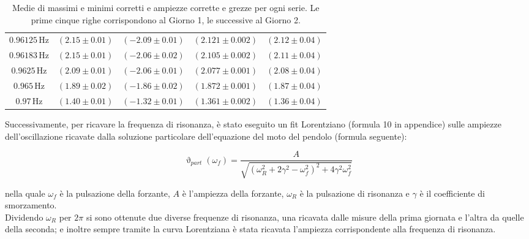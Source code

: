 \documentclass{article}
\begin{document}
\begin{table}[H]
\begin{tabular}{|c|c|c|c|c|}
$0.96125\,\text{Hz}$ & $(2.15 \pm 0.01)$ & $(-2.09 \pm 0.01)$ & $(2.121 \pm 0.002)$ & $(2.12 \pm 0.04)$ \\
$0.96183\,\text{Hz}$ & $(2.15 \pm 0.01)$ & $(-2.06 \pm 0.02)$ & $(2.105 \pm 0.002)$ & $(2.11 \pm 0.04)$ \\
$0.9625\,\text{Hz}$ & $(2.09 \pm 0.01)$ & $(-2.06 \pm 0.01)$ & $(2.077 \pm 0.001)$ & $(2.08 \pm 0.04)$ \\
$0.965\,\text{Hz}$ & $(1.89 \pm 0.02)$ & $(-1.86 \pm 0.02)$ & $(1.872 \pm 0.001)$ & $(1.87 \pm 0.04)$ \\
$0.97\,\text{Hz}$ & $(1.40 \pm 0.01)$ & $(-1.32 \pm 0.01)$ & $(1.361 \pm 0.002)$ & $(1.36 \pm 0.04)$ \\
\bottomrule
\end{tabular}
\caption{Medie di massimi e minimi corretti e ampiezze corrette e grezze per ogni serie. Le prime cinque righe corrispondono al Giorno 1, le successive al Giorno 2.}
\label{max_min_amp_scientifica}
\end{table}



Successivamente, per ricavare la frequenza di risonanza, è stato eseguito un fit Lorentziano (formula 10 in appendice) sulle ampiezze dell'oscillazione ricavate dalla soluzione particolare dell'equazione del moto del pendolo (formula seguente):

\begin{equation}
    \upvartheta_{part}(\omega_f) = \frac{A}{\sqrt{(\omega_R^2 + 2\gamma^2 - \omega_f^2)^2 + 4\gamma^2 \omega_f^2}}
\end{equation}

nella quale $\omega_f$ è la pulsazione della forzante, $A$ è l'ampiezza della forzante, $\omega_R$ è la pulsazione di risonanza e $\gamma$ è il coefficiente di smorzamento.
\\
Dividendo $\omega_R$ per $2\pi$ si sono ottenute due diverse frequenze di risonanza, una ricavata dalle misure della prima giornata e l'altra da quelle della seconda; e inoltre sempre tramite la curva Lorentziana è stata ricavata l'ampiezza corrispondente alla frequenza di risonanza.
\end{document}

